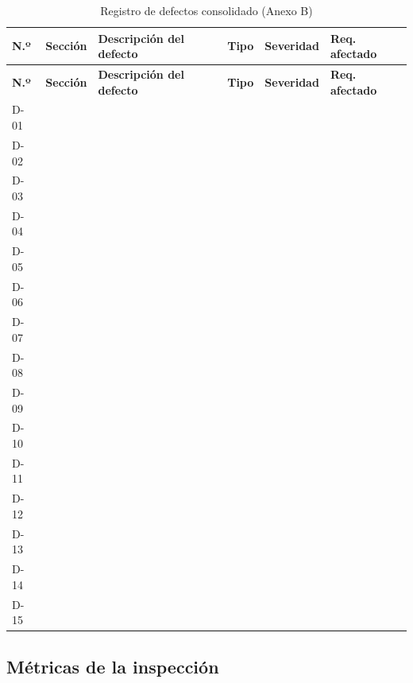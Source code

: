 \documentclass[journal,onecolumn]{IEEEtran}
\newcommand{\guia}[2]{%
	\begin{mdframed}[style=guia]
		\sloppy
		\noindent\textbf{Responsable: #1}\\[2pt]
		#2
	\end{mdframed}
}
\newif\ifguias
\let\guiaoriginal\guia
\renewcommand{\guia}[2]{\ifguias\guiaoriginal{#1}{#2}\fi}
\begin{document}
	\begin{longtable}{C{1.0cm} L{2.0cm} L{4.6cm} L{1.9cm} L{1.7cm} L{1.8cm}}
		\caption{Registro de defectos consolidado (Anexo B)}\label{tab:defectos}\\
		\toprule
		\textbf{N.º} & \textbf{Sección} & \textbf{Descripción del defecto} & \textbf{Tipo} &
		\textbf{Severidad} & \textbf{Req. afectado} \\
		\midrule
		\endfirsthead
		\toprule
		\textbf{N.º} & \textbf{Sección} & \textbf{Descripción del defecto} & \textbf{Tipo} &
		\textbf{Severidad} & \textbf{Req. afectado} \\
		\midrule
		\endhead
		\bottomrule
		\endfoot
		D-01 & & & & & \\
		D-02 & & & & & \\
		D-03 & & & & & \\
		D-04 & & & & & \\
		D-05 & & & & & \\
		D-06 & & & & & \\
		D-07 & & & & & \\
		D-08 & & & & & \\
		D-09 & & & & & \\
		D-10 & & & & & \\
		D-11 & & & & & \\
		D-12 & & & & & \\
		D-13 & & & & & \\
		D-14 & & & & & \\
		D-15 & & & & & \\
	\end{longtable}
	
	\guia{Kevin (Integrante 2)}{%
		Transcribir el Anexo~B al informe. \textbf{Mínimo 15 filas}, sin duplicados, y al menos
		3 críticos o mayores. La columna «Requisito afectado» usa los identificadores reales del
		ERS: \texttt{RF-01} a \texttt{RF-25}, \texttt{RNF-01} a \texttt{RNF-16}, \texttt{RD-01} a
		\texttt{RD-09}, \texttt{CU-01} a \texttt{CU-13} o \texttt{HU-01} a \texttt{HU-15}.
		Un identificador fuera de esos rangos es un defecto inventado y cae en el indicador~S3
		(75\,\% de descuento). Mantener sincronizado
		\texttt{02\_Inspeccion/AnexoB\_registro\_defectos.xlsx}.}
	
	\subsection{Métricas de la inspección}
	
\end{document}
